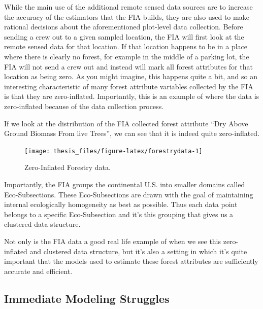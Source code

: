 \documentclass[12pt,twoside]{reedthesis}
\begin{document}
While the main use of the additional remote sensed data sources are to increase the accuracy of the estimators that the FIA builds, they are also used to make rational decisions about the aforementioned plot-level data collection. Before sending a crew out to a given sampled location, the FIA will first look at the remote sensed data for that location. If that location happens to be in a place where there is clearly no forest, for example in the middle of a parking lot, the FIA will not send a crew out and instead will mark all forest attributes for that location as being zero. As you might imagine, this happens quite a bit, and so an interesting characteristic of many forest attribute variables collected by the FIA is that they are zero-inflated. Importantly, this is an example of where the data is zero-inflated because of the data collection process.

If we look at the distribution of the FIA collected forest attribute ``Dry Above Ground Biomass From live Trees'', we can see that it is indeed quite zero-inflated.
\begin{figure}

{\centering \texttt{[image: thesis\_files/figure-latex/forestrydata-1]} 

}

\caption{Zero-Inflated Forestry data.}\label{fig:forestrydata}
\end{figure}
Importantly, the FIA groups the continental U.S. into smaller domains called Eco-Subsections. These Eco-Subsections are drawn with the goal of maintaining internal ecologically homogeneity as best as possible. Thus each data point belongs to a specific Eco-Subsection and it's this grouping that gives us a clustered data structure.

Not only is the FIA data a good real life example of when we see this zero-inflated and clustered data structure, but it's also a setting in which it's quite important that the models used to estimate these forest attributes are sufficiently accurate and efficient.

\hypertarget{immediate-modeling-struggles}{%
\subsection{Immediate Modeling Struggles}\label{immediate-modeling-struggles}}
\end{document}

